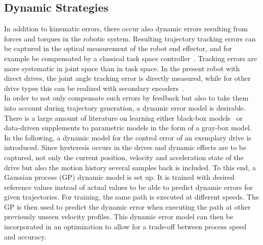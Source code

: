 \documentclass[5p,times,procedia]{elsarticle}
\begin{document}
\subsection{Dynamic Strategies}\label{subsec:dynError}
In addition to kinematic errors, there occur also dynamic errors resulting from forces and torques in the robotic system.
Resulting trajectory tracking errors can be captured in the optical measurement of the robot end effector, and for example be compensated by a classical task space controller~\cite{Siciliano09}.
Tracking errors are more systematic in joint space than in task space.
In the present robot with direct drives, the joint angle tracking error is directly measured, while for other drive types this can be realized with secondary encoders~\cite{Mesmer22}.\\
In order to not only compensate such errors by feedback but also to take them into account during trajectory generation, a dynamic error model is desirable.
There is a large amount of literature on learning either black-box models~\cite{NguyenTuong08b} or data-driven supplements to parametric models in the form of a gray-box model.
In the following, a dynamic model for the control error of an exemplary drive is introduced.
Since hysteresis occurs in the drives and dynamic effects are to be captured, not only the current position, velocity and acceleration state of the drive but also the motion history several samples back is included. 
To this end, a Gaussian process (GP) dynamic model is set up.
It is trained with desired reference values instead of actual values to be able to predict dynamic errors for given trajectories.
For training, the same path is executed at different speeds. 
The GP is then used to predict the dynamic error when executing the path at other previously unseen velocity profiles.
This dynamic error model can then be incorporated in an optimization to allow for a trade-off between process speed and accuracy.
%
\end{document}
